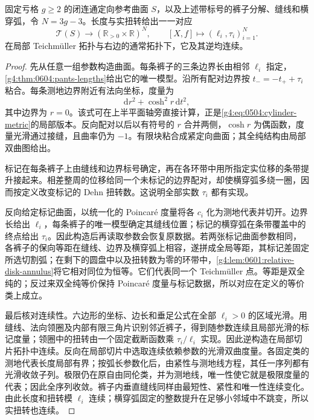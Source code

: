 \begin{theorem}
	\label{g4:thm:0604:fenchel-nielsen}
	固定亏格 \(g\ge2\) 的闭连通定向参考曲面 \(S\)，以及上述带标号的裤子分解、缝线和横穿弧，令 \(N=3g-3\)。长度与实扭转给出一一对应
	\[
		\mathcal T(S)\longrightarrow
		(\mathbb R_{>0}\times\mathbb R)^N,
		\qquad [X,f]\longmapsto(\ell_i,\tau_i)_{i=1}^N.
	\]
	在局部 Teichmüller 拓扑与右边的通常拓扑下，它及其逆均连续。
\end{theorem}
\begin{proof}
	先从任意一组参数构造曲面。每条裤子的三条边界长由相邻 \(\ell_i\) 指定，\cref{g4:thm:0604:pants-lengths}给出它的唯一模型。沿所有配对边界按 \(t_-=-t_++\tau_i\) 粘合。每条测地边界附近有法向坐标，度量为
	\[
		\mathrm{d}r^2+\cosh^2r\,\mathrm{d}t^2,
	\]
	其中边界为 \(r=0\)。该式可在上半平面轴旁直接计算，正是\cref{g4:eq:0504:cylinder-metric}的局部版本。反向配对以后以有符号的 \(r\) 合并两侧，\(\cosh r\) 为偶函数，度量光滑通过接缝，且曲率仍为 \(-1\)。有限块粘合成紧定向曲面；其全纯结构由局部双曲图给出。

	标记在每条裤子上由缝线和边界标号确定，再在各环带中用所指定实位移的条带提升接起来。相差整周的位移给同一个未标记的边界配对，却使横穿弧多绕一圈，因而按定义改变标记的 Dehn 扭转数。这说明全部实数 \(\tau_i\) 都有实现。

	反向给定标记曲面，以统一化的 Poincaré 度量将各 \(c_i\) 化为测地代表并切开。边界长给出 \(\ell_i\)，每条裤子的唯一模型确定其缝线位置；标记的横穿弧在条带覆盖中的终点给出 \(\tau_i\)。因此构造后再读取参数会恢复原数据。若两张标记曲面参数相同，各裤子的保向等距在缝线、边界及横穿弧上相容，遂拼成全局等距，其标记差固定所选切割弧；在剩下的圆盘中以及扭转数为零的环带中，\cref{g4:lem:0601:relative-disk-annulus}将它相对同位为恒等。它们代表同一个 Teichmüller 点。等距是双全纯的；反过来双全纯等价保持 Poincaré 度量与标记数据，所以对应在定义的等价类上成立。

	最后核对连续性。六边形的坐标、边长和垂足公式在全部 \(\ell_i>0\) 的区域光滑。用缝线、法向领圈及内部有限三角片识别邻近裤子，得到随参数连续且局部光滑的标记度量；领圈中的扭转由一个固定截断函数乘 \(\tau_i/\ell_i\) 实现。因此逆构造在局部切片拓扑中连续。反向在局部切片中选取连续依赖参数的光滑双曲度量。各固定类的测地代表长度局部有界；按弧长参数化后，由紧性与测地线方程，其任一序列都有光滑收敛子列。极限仍在原自由同伦类，并为测地线，唯一性使它就是极限度量的代表；因此全序列收敛。裤子内垂直缝线同样由最短性、紧性和唯一性连续变化。由此长度和扭转模 \(\ell_i\) 连续；横穿弧固定的整数提升在足够小邻域中不跳变，所以实扭转也连续。
\end{proof}

